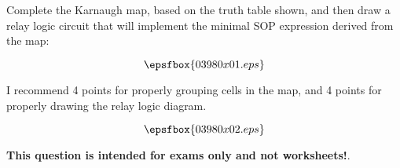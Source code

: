 

Complete the Karnaugh map, based on the truth table shown, and then draw a relay logic circuit that will implement the minimal SOP expression derived from the map:

$$\epsfbox{03980x01.eps}$$







I recommend 4 points for properly grouping cells in the map, and 4 points for properly drawing the relay logic diagram.

$$\epsfbox{03980x02.eps}$$







{\bf This question is intended for exams only and not worksheets!}.



